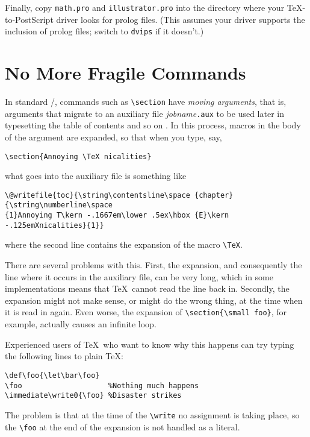 Finally, copy \verb+math.pro+ and \verb+illustrator.pro+ into the
directory where your \TeX-to-PostScript driver looks for prolog files.
(This assumes your driver supports the inclusion of prolog files;
switch to \verb+dvips+ if it doesn't.)

\section{No More Fragile Commands}

In standard \latex/, commands such as \verb+\section+ have {\it moving
arguments}, that is, arguments that migrate to an auxiliary file {\it
jobname}\verb+.aux+ to be used later in typesetting the table of
contents and so on \cite[33--34]{Lamport}.
In this process, macros in the body of the argument
are expanded, so that when you type, say,
\begin{verbatim}
\section{Annoying \TeX nicalities}
\end{verbatim}
what goes into the auxiliary file is something like
\begin{verbatim}
\@writefile{toc}{\string\contentsline\space {chapter}{\string\numberline\space 
{1}Annoying T\kern -.1667em\lower .5ex\hbox {E}\kern -.125emXnicalities}{1}}
\end{verbatim}
where the second line contains the expansion of the macro \verb+\TeX+.

There are several problems with this. First, the expansion, and
consequently the line where it occurs in the auxiliary file, can be
very long, which in some implementations means that \TeX\ cannot
read the line back in.  Secondly, the expansion might not
make sense, or might do the wrong thing, at the time when it is read in again.
Even worse, the expansion 
of \verb+\section{\small foo}+, for example, actually
causes an infinite loop.

\begin{wizard}
Experienced users of \TeX\ who
want to know why this happens can try typing the following lines to
plain \TeX:
\begin{verbatim}
\def\foo{\let\bar\foo}
\foo                    %Nothing much happens
\immediate\write0{\foo} %Disaster strikes
\end{verbatim}
The problem is that at the time of the \verb+\write+ no assignment is
taking place, so the \verb+\foo+ at the end of the expansion is not
handled as a literal.
\end{wizard}

